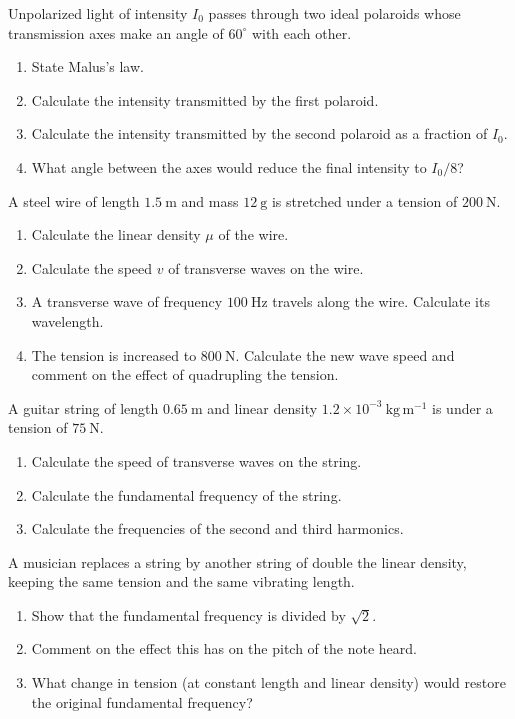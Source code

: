 \documentclass[11pt]{article}
\begin{document}
\begin{exercice}
Unpolarized light of intensity $I_0$ passes through two ideal polaroids whose transmission axes make an angle of $60^{\circ}$ with each other.
\begin{enumerate}
\item State Malus's law.
\item Calculate the intensity transmitted by the first polaroid.
\item Calculate the intensity transmitted by the second polaroid as a fraction of $I_0$.
\item What angle between the axes would reduce the final intensity to $I_0/8$?
\end{enumerate}
\end{exercice}

\begin{exercice}
A steel wire of length $1.5\ \mathrm{m}$ and mass $12\ \mathrm{g}$ is stretched under a tension of $200\ \mathrm{N}$.
\begin{enumerate}
\item Calculate the linear density $\mu$ of the wire.
\item Calculate the speed $v$ of transverse waves on the wire.
\item A transverse wave of frequency $100\ \mathrm{Hz}$ travels along the wire. Calculate its wavelength.
\item The tension is increased to $800\ \mathrm{N}$. Calculate the new wave speed and comment on the effect of quadrupling the tension.
\end{enumerate}
\end{exercice}

\begin{exercice}
A guitar string of length $0.65\ \mathrm{m}$ and linear density $1.2\times10^{-3}\ \mathrm{kg\,m^{-1}}$ is under a tension of $75\ \mathrm{N}$.
\begin{enumerate}
\item Calculate the speed of transverse waves on the string.
\item Calculate the fundamental frequency of the string.
\item Calculate the frequencies of the second and third harmonics.
\end{enumerate}
\end{exercice}

\begin{exercice}
A musician replaces a string by another string of double the linear density, keeping the same tension and the same vibrating length.
\begin{enumerate}
\item Show that the fundamental frequency is divided by $\sqrt{2}$.
\item Comment on the effect this has on the pitch of the note heard.
\item What change in tension (at constant length and linear density) would restore the original fundamental frequency?
\end{enumerate}
\end{exercice}
\end{document}
